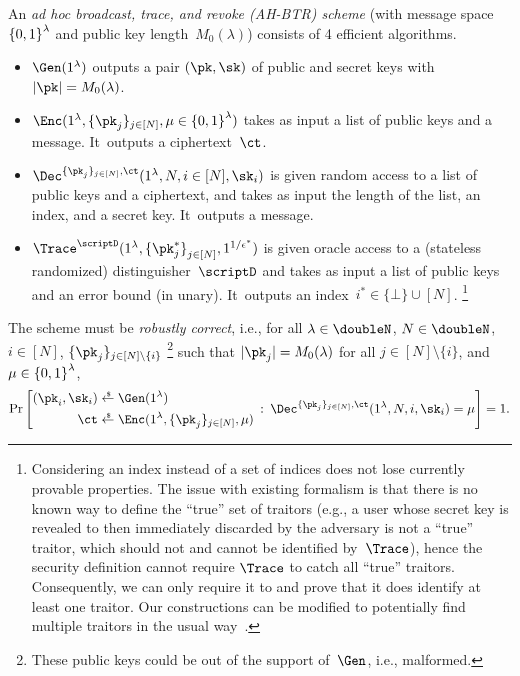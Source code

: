\begin{definition}[AH-BTR]\label{def:ahbtr}
An \emph{ad hoc broadcast, trace, and revoke (AH-BTR) scheme}
(with message space~${\{0,1\}}^\lambda$ and public key length~$M_0(\lambda)$)
consists of 4 efficient algorithms.
\begin{itemize}
\item $\Gen(1^\lambda)$ outputs a pair $(\pk,\sk)$ of public and secret keys
with ${|\pk|=M_0(\lambda)}$.
\item $\Enc(1^\lambda,\{\pk_j\}_{j\in[N]},{\mu\in\bit^\lambda})$
takes as input
a list of public keys and a message.
It~outputs a ciphertext~$\ct$.
\item $\Dec^{\{\pk_j\}_{j\in[N]},\ct}(1^\lambda,N,i\in[N],\sk_i)$
is given random access to a list of public keys and a ciphertext, and
takes as input
the length of the list,
an index, and
a secret key.
It~outputs a message.
\item $\Trace^\scriptD(1^\lambda,\{\pk^\ast_j\}_{j\in[N]}^\sphantom,1^{1/\epsilon^\ast})$
is given oracle access to a (stateless randomized) distinguisher~$\scriptD$ and takes as input
a list of public keys and an error bound (in unary).
It~outputs an index~${i^\ast\in\{\bot\}\cup[N]}$.%
\footnote{Considering an index instead of a set of indices
does not lose currently provable properties.
The issue with existing formalism is that
there is no known way to define the ``true'' set of traitors
(e.g., a user whose secret key is
revealed to then immediately discarded by the adversary
is not a ``true'' traitor,
which should not and cannot be identified by~$\Trace$),
hence the security definition cannot require $\Trace$
to catch all ``true'' traitors.
Consequently, we can only require it to and prove that it does
identify at least one traitor.
Our constructions can be modified to potentially find multiple traitors
in the usual way~\cite{EC:BonSahWat06}.
}
\end{itemize}
The scheme must be \emph{robustly correct}, i.e., for all
${\lambda\in\doubleN}$,
${N\in\doubleN}$,
${i\in[N]}$,\WideNarrow{}{\linebreak[4]}
$\{\pk_j\}_{j\in[N]\setminus\{i\}}$%
\footnote{These public keys could be out of the support of~$\Gen$,
i.e., malformed.}
such that ${|\pk_j|=M_0(\lambda)}$ for all ${j\in[N]\setminus\{i\}}$, and
${\mu\in{\{0,1\}}^\lambda}$,
\begin{align*}
\Pr\left[
\begin{aligned}
(\pk_i,\sk_i)&{}\draws\Gen(1^\lambda)\\
\ct&{}\draws\Enc(1^\lambda,\{\pk_j\}_{j\in[N]},\mu)
\end{aligned}
\::\:
\Dec^{\{\pk_j\}_{j\in[N]},\ct}(1^\lambda,N,i,\sk_i)=\mu
\right]=1.
\end{align*}
\end{definition}
